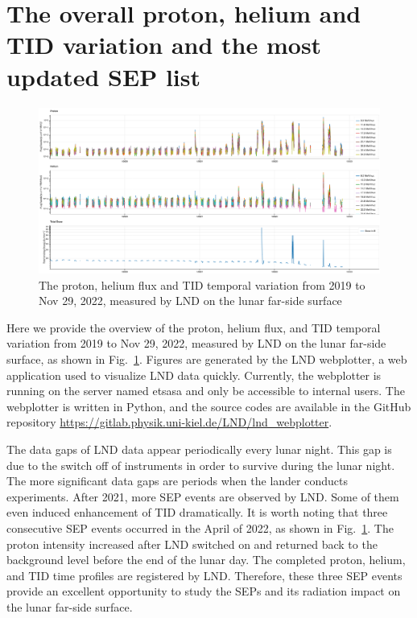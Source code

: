 \section*{The overall proton, helium and TID variation and the most updated SEP list}

\begin{figure}[!htb]
    \centering
    \includegraphics[angle = 90, width =\textwidth, height = 0.95\textheight]{images/LND-proton-helium-TID.png}
    \caption[The overview of proton, helium flux and \ac{TID} measured by \ac{LND}]{The proton, helium flux and \ac{TID} temporal variation from 2019 to Nov 29, 2022, measured by \ac{LND} on the lunar far-side surface}
    \label{Fig:appendix_LND_proton_helium_TID}
\end{figure}
\clearpage
Here we provide the overview of the proton, helium flux, and \ac{TID} temporal variation from 2019 to Nov 29, 2022, measured by \ac{LND} on the lunar far-side surface, as shown in Fig.~\ref{Fig:appendix_LND_proton_helium_TID}.
Figures are generated by the \ac{LND} webplotter, a web application used to visualize \ac{LND} data quickly. 
Currently, the webplotter is running on the server named etsasa and only be accessible to internal users.
The webplotter is written in Python, and the source codes are available in the GitHub repository \url{https://gitlab.physik.uni-kiel.de/LND/lnd_webplotter}.

The data gaps of \ac{LND} data appear periodically every lunar night. This gap is due to the switch off of instruments in order to survive during the lunar night. The more significant data gaps are periods when the lander conducts experiments. After 2021, more \ac{SEP} events are observed by \ac{LND}. Some of them even induced enhancement of \ac{TID} dramatically. 
It is worth noting that three consecutive \ac{SEP} events occurred in the April of 2022, as shown in Fig.~\ref{Fig:appendix_LND_proton_helium_TID}. The proton intensity increased after \ac{LND} switched on and returned back to the background level before the end of the lunar day. The completed proton, helium, and \ac{TID} time profiles are registered by \ac{LND}. Therefore, these three \ac{SEP} events provide an excellent opportunity to study the \acp{SEP} and its radiation impact on the lunar far-side surface.

